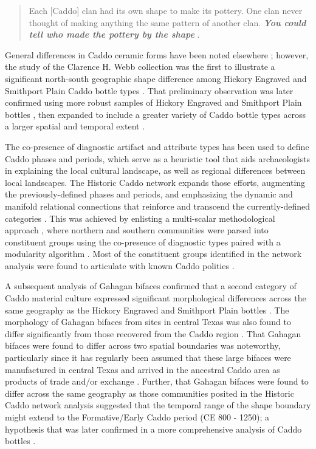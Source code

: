 \documentclass[smallextended]{svjour3}       %
\begin{document}
\begin{quote}
Each {[}Caddo{]} clan had its own shape to make its pottery. One clan
never thought of making anything the same pattern of another clan.
\emph{\textbf{You could tell who made the pottery by the shape}}
\cite[395]{RN9357x}.
\end{quote}

General differences in Caddo ceramic forms have been noted elsewhere
\cite{RN5650,RN7162}; however, the study of the Clarence H. Webb
collection was the first to illustrate a significant north-south
geographic shape difference among Hickory Engraved and Smithport Plain
Caddo bottle types \cite{RN8370}. That preliminary observation was later
confirmed using more robust samples of Hickory Engraved and Smithport
Plain bottles \cite{RN8074,RN7927}, then expanded to include a greater
variety of Caddo bottle types across a larger spatial and temporal
extent \cite{RN8312}.

The co-presence of diagnostic artifact and attribute types has been used
to define Caddo phases and periods, which serve as a heuristic tool that
aids archaeologists in explaining the local cultural landscape, as well
as regional differences between local landscapes. The Historic Caddo
network expands those efforts, augmenting the previously-defined phases
and periods, and emphasizing the dynamic and manifold relational
connections that reinforce and transcend the currently-defined
categories \cite{RN8031}. This was achieved by enlisting a multi-scalar
methodological approach \cite{RN5644,RN8039}, where northern and
southern communities were parsed into constituent groups using the
co-presence of diagnostic types paired with a modularity algorithm
\cite{RN8051,RN8024}. Most of the constituent groups identified in the
network analysis were found to articulate with known Caddo polities
\cite{RN8031}.

A subsequent analysis of Gahagan bifaces confirmed that a second
category of Caddo material culture expressed significant morphological
differences across the same geography as the Hickory Engraved and
Smithport Plain bottles \cite{RN8158}. The morphology of Gahagan bifaces
from sites in central Texas was also found to differ significantly from
those recovered from the Caddo region \cite{RN8322}. That Gahagan
bifaces were found to differ across two spatial boundaries was
noteworthy, particularly since it has regularly been assumed that these
large bifaces were manufactured in central Texas and arrived in the
ancestral Caddo area as products of trade and/or exchange
\cite{RN8322,RN8158}. Further, that Gahagan bifaces were found to differ
across the same geography as those communities posited in the Historic
Caddo network analysis suggested that the temporal range of the shape
boundary might extend to the Formative/Early Caddo period (CE 800 -
1250); a hypothesis that was later confirmed in a more comprehensive
analysis of Caddo bottles \cite{RN8312}.
\end{document}
